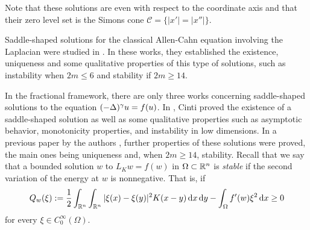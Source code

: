 Note that these solutions are even with respect to the coordinate axis and that their zero level set is the Simons cone $\mathscr{C} = \{|x'|=|x''|\}$. 






%

Saddle-shaped solutions for the classical Allen-Cahn equation involving the Laplacian were studied in \cite{DangFifePeletier, Schatzman, CabreTerraI,CabreTerraII, Cabre-Saddle}. In these works, they established the existence, uniqueness and some qualitative properties of this type of solutions, such as instability when $2m\leq 6$ and stability if $2m\geq 14$.


In the fractional framework, there are only three works concerning saddle-shaped solutions to the equation $(-\Delta)^\gamma u = f(u)$. In  \cite{Cinti-Saddle,Cinti-Saddle2}, Cinti proved the existence of a saddle-shaped solution as well as some qualitative properties such as asymptotic behavior, monotonicity properties, and instability in low dimensions. In a previous paper by the authors \cite{Felipe-Sanz-Perela:SaddleFractional}, further properties of these solutions were proved, the main ones being uniqueness and, when $2m\geq 14$, stability. Recall that we say that a bounded solution $w$ to $L_K w = f(w)$ in $\Omega\subset \mathbb{R}^n$ is \emph{stable} if the second variation of the energy at $w$ is nonnegative. That is, if
\begin{equation}
\label{Eq:StablityCondition}	
Q_w(\xi) := \dfrac{1}{2} \int_{\mathbb{R}^n} \int_{\mathbb{R}^n} |\xi (x) - \xi(y)|^2 K(x - y) \,\mathrm{d} x \,\mathrm{d} y - \int_{\Omega} f'(w) \xi^2 \,\mathrm{d} x \geq 0
\end{equation}
for every $\xi \in C^\infty_0 (\Omega)$.


